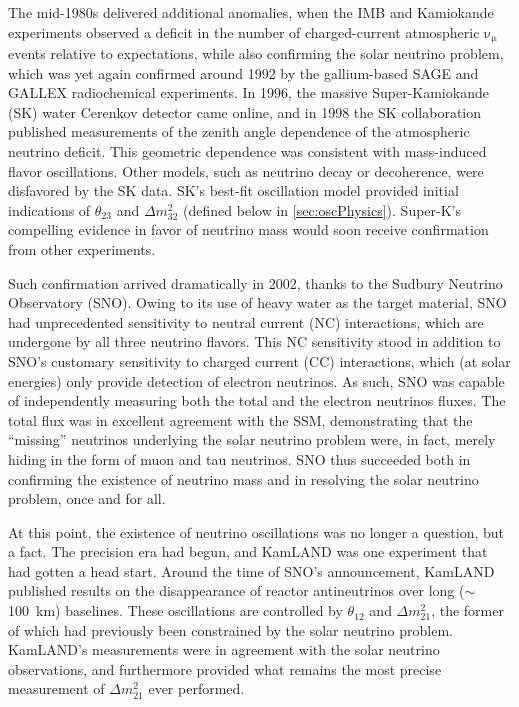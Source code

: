 \documentclass[../thesis.tex]{subfiles}
\begin{document}
The mid-1980s delivered additional anomalies, when the IMB and Kamiokande experiments observed a deficit in the number of charged-current atmospheric \(\mathrm{\nu_\mu}\) events relative to expectations, while also confirming the solar neutrino problem, which was yet again confirmed around 1992 by the gallium-based SAGE and GALLEX radiochemical experiments. In 1996, the massive Super-Kamiokande (SK) water Cerenkov detector came online, and in 1998 the SK collaboration published measurements of the zenith angle dependence of the atmospheric neutrino deficit. This geometric dependence was consistent with mass-induced flavor oscillations. Other models, such as neutrino decay or decoherence, were disfavored by the SK data. SK's best-fit oscillation model provided initial indications of \(\theta_{23}\) and \(\Delta m^2_{32}\) (defined below in \autoref{sec:oscPhysics}). Super-K's compelling evidence in favor of neutrino mass would soon receive confirmation from other experiments.

Such confirmation arrived dramatically in 2002, thanks to the Sudbury Neutrino Observatory (SNO). Owing to its use of heavy water as the target material, SNO had unprecedented sensitivity to neutral current (NC) interactions, which are undergone by all three neutrino flavors. This NC sensitivity stood in addition to SNO's customary sensitivity to charged current (CC) interactions, which (at solar energies) only provide detection of electron neutrinos. As such, SNO was capable of independently measuring both the total and the electron neutrinos fluxes. The total flux was in excellent agreement with the SSM, demonstrating that the ``missing'' neutrinos underlying the solar neutrino problem were, in fact, merely hiding in the form of muon and tau neutrinos. SNO thus succeeded both in confirming the existence of neutrino mass and in resolving the solar neutrino problem, once and for all.

At this point, the existence of neutrino oscillations was no longer a question, but a fact. The precision era had begun, and KamLAND was one experiment that had gotten a head start. Around the time of SNO's announcement, KamLAND published results on the disappearance of reactor antineutrinos over long ($\sim$100~km) baselines. These oscillations are controlled by $\theta_{12}$ and \(\Delta m^2_{21}\), the former of which had previously been constrained by the solar neutrino problem. KamLAND's measurements were in agreement with the solar neutrino observations, and furthermore provided what remains the most precise measurement of \(\Delta m^2_{21}\) ever performed.
\end{document}
